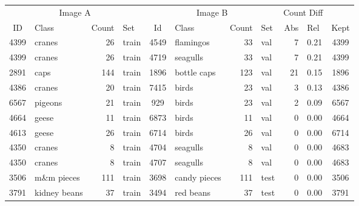 \begin{tabular}{clrlclrlrlc}
 \toprule
\multicolumn{4}{c}{Image A} & \multicolumn{4}{c}{Image B} & \multicolumn{2}{c}{Count Diff} \\
ID & Class & Count & Set & Id & Class & Count & Set & Abs & Rel & Kept\\
\cmidrule(r){1-4} \cmidrule(r){5-8} \cmidrule(r){9-10} \cmidrule(r){11-11}

4399 & cranes & 26 & train & 4549 & flamingos & 33 & val & 7 & 0.21 & 4399\\
4399 & cranes & 26 & train & 4719 & seagulls & 33 & val & 7 & 0.21 & 4399 \\
2891 & caps & 144 & train & 1896 & bottle caps & 123 & val & 21 & 0.15 & 1896 \\
4386 & cranes & 20 & train & 7415 & birds & 23 & val & 3 & 0.13 & 4386\\
6567 & pigeons & 21 & train & 929 & birds & 23 & val & 2 & 0.09 & 6567\\
4664 & geese & 11 & train & 6873 & birds & 11 & val & 0 & 0.00 & 4664\\
4613 & geese & 26 & train & 6714 & birds & 26 & val & 0 & 0.00 & 6714\\
4350 & cranes & 8 & train & 4704 & seagulls & 8 & val & 0 & 0.00 & 4683 \\
4350 & cranes & 8 & train & 4707 & seagulls & 8 & val & 0 & 0.00 & 4683\\
3506 & m\&m pieces & 111 & train & 3698 & candy pieces & 111 & test & 0 & 0.00 & 3506\\
3791 & kidney beans & 37 & train & 3494 & red beans & 37 & test & 0 & 0.00 & 3791\\

\bottomrule
\end{tabular}